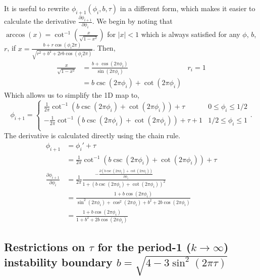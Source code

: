 \indent It is useful to rewrite $\phi_{i+1}(\phi_i,b,\tau)$ in a different form, which makes it easier to calculate the derivative $\frac{\partial \phi_{i+1}}{\partial \phi_i}$. We begin by noting that $\arccos(x) = \cot^{-1}(\frac{x}{\sqrt{1-x^2}})$ for $|x|<1$ which is always satisfied for any $\phi$, $b$, $r$, if $x=\frac{b+r \cos(\phi_i 2\pi)}{\sqrt{r^2+b^2+2rb\cos(\phi_i 2\pi)}}$. Then, 
\begin{align}
    \frac{x}{\sqrt{1-x^2}} &= \frac{b + \cos(2\pi \phi_i)}{\sin(2\pi \phi_i)} & r_i = 1 \nonumber \\
    &= b\csc(2\pi \phi_i) + \cot(2\pi \phi_i)
\end{align} 
Which allows us to simplify the 1D map to,
\begin{equation}
    \phi_{i+1} =
\begin{cases}
        \frac{1}{2\pi}\cot^{-1}(b\csc(2\pi \phi_i)+\cot(2\pi \phi_i))+ \tau & 0 \leq \phi_i \leq 1/2 \\
       -\frac{1}{2\pi}\cot^{-1}(b\csc(2\pi \phi_i)+\cot(2\pi \phi_i))+ \tau + 1 & 1/2 \leq \phi_i \leq 1 \\
    \end{cases}.
\end{equation}
The derivative is calculated directly using the chain rule.
\begin{align}
    \phi_{i+1} &= \phi_i' + \tau \nonumber \\
    &= \frac{1}{2\pi}\cot^{-1}(b\csc(2\pi \phi_i)+\cot(2\pi \phi_i))+ \tau \nonumber \\
    \frac{\partial \phi_{i+1}}{\partial \phi_i} &= \frac{1}{2\pi} \frac{-\frac{\partial (b\csc(2\pi \phi_i)+\cot(2\pi \phi_i))}{\partial \phi_i}}{1+(b\csc(2\pi \phi_i)+\cot(2\pi \phi_i))^2} \nonumber \\
    &= \frac{1+b\cos(2\pi \phi_i)}{\sin^2(2\pi \phi_i)+\cos^2(2\pi \phi_i) + b^2 + 2b\cos(2\pi \phi_i)} \nonumber \\
    &=\frac{1+b\cos(2\pi \phi_i)}{1 + b^2 + 2b\cos(2\pi \phi_i)}
    \label{eq: derivative A}
\end{align}

\subsection{Restrictions on $\tau$ for the period-1 ($k\rightarrow\infty$) instability boundary $b = \sqrt{4-3\sin^2(2\pi\tau)}$} \label{supp: sub2}

